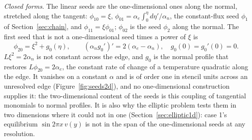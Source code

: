 \documentclass[11pt]{amsart}
\theoremstyle{definition}
\theoremstyle{remark}
\newcommand{\para}[1]{\par\smallskip\noindent\textit{#1}.\enspace}
\begin{document}
\para{Closed forms}
The linear seeds are the one-dimensional ones along the normal, stretched
along the tangent: $\phi_{10} = \xi$, $\phi_{01} = \alpha_e \int_0^\eta
d\eta' / \alpha_n$, the constant-flux seed $\phi_1$ of
Section~\ref{sec:chain}, and $\phi_{11} = \xi \phi_{01}$; $\phi_{02}$ is the
seed $\phi_2$ along the normal. The first seed that is not a
one-dimensional seed times a power of $\xi$ is
\begin{equation}
  \label{eq:phi20}
  \phi_{20} = \xi^2 + g_0(\eta), \qquad
  (\alpha_n g_0')' = 2 (\alpha_e - \alpha_n), \quad g_0(0) = g_0'(0) = 0.
\end{equation}
$L \xi^2 = 2 \alpha_n$ is not constant across the edge, and $g_0$ is the
normal profile that restores $L \phi_{20} = 2 \alpha_e$, the constant rate
of change of a temperature quadratic along the edge. It vanishes on a
constant $\alpha$ and is of order one in stencil units across an
unresolved edge (Figure~\ref{fig:seeds2d}), and no one-dimensional
construction supplies it: the two-dimensional content of the seeds is this
coupling of tangential monomials to normal profiles. It is also why the
elliptic problem tests them in two dimensions where it could not in one
(Section~\ref{sec:elliptic1d}): case 1's equilibrium
$\sin 2\pi x\, v(y)$ is not in the span of the one-dimensional seeds at any
resolution.
\end{document}
